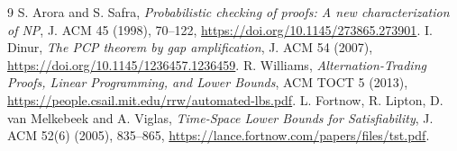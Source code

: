 \documentclass[11pt]{article}
\begin{document}
\begin{thebibliography}{9}
 S. Arora and S. Safra,
\emph{Probabilistic checking of proofs:
A new characterization of NP}, J. ACM 45 (1998),
70--122, \url{https://doi.org/10.1145/273865.273901}.
 I. Dinur,
\emph{The PCP theorem by gap amplification},
J. ACM 54 (2007),
\url{https://doi.org/10.1145/1236457.1236459}.
 R. Williams,
\emph{Alternation-Trading Proofs, Linear Programming,
and Lower Bounds}, ACM TOCT 5 (2013),
\url{https://people.csail.mit.edu/rrw/automated-lbs.pdf}.
 L. Fortnow, R. Lipton,
D. van Melkebeek and A. Viglas,
\emph{Time-Space Lower Bounds for Satisfiability},
J. ACM 52(6) (2005), 835--865,
\url{https://lance.fortnow.com/papers/files/tst.pdf}.
\end{thebibliography}
\end{document}
